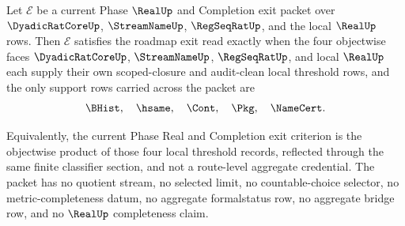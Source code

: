 \begin{theorem}
\label{thm:real-l10-current-phase-exit-local-threshold}
Let $\mathcal E$ be a current Phase $\RealUp$ and Completion exit packet over $\DyadicRatCoreUp$, $\StreamNameUp$, $\RegSeqRatUp$, and the local $\RealUp$ rows. Then $\mathcal E$ satisfies the roadmap exit read exactly when the four objectwise faces $\DyadicRatCoreUp$, $\StreamNameUp$, $\RegSeqRatUp$, and local $\RealUp$ each supply their own scoped-closure and audit-clean local threshold rows, and the only support rows carried across the packet are
$$
\BHist,\quad \hsame,\quad \Cont,\quad \Pkg,\quad \NameCert.
$$

Equivalently, the current Phase Real and Completion exit criterion is the objectwise product of those four local threshold records, reflected through the same finite classifier section, and not a route-level aggregate credential. The packet has no quotient stream, no selected limit, no countable-choice selector, no metric-completeness datum, no aggregate formalstatus row, no aggregate bridge row, and no $\RealUp$ completeness claim.
\end{theorem}
